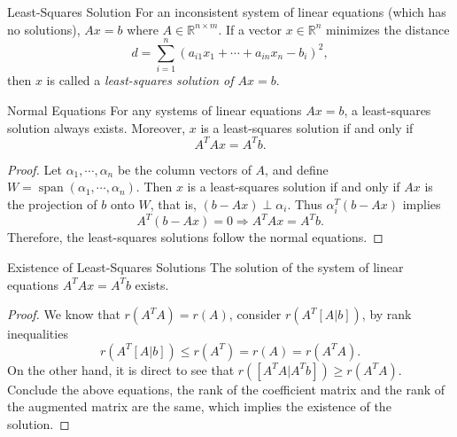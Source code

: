 \begin{definition}{Least-Squares Solution}{}
  For an inconsistent system of linear equations (which has no solutions),
  $Ax = b$ where $A \in \mathbb{R}^{n \times m}$.
  If a vector $x \in \mathbb{R}^n$ minimizes the distance
  \begin{equation}
    d = \sum\limits_{i = 1}^n (a_{i1}x_1 + \cdots + a_{in}x_n - b_i)^2,
  \end{equation}
  then $x$ is called a \emph{least-squares solution of $Ax = b$}.
\end{definition}

\begin{theorem}{Normal Equations}{}
  For any systems of linear equations $Ax = b$, a least-squares solution always
  exists.
  Moreover, $x$ is a least-squares solution if and only if
  \begin{equation}
    A^TAx = A^Tb.
  \end{equation}
\end{theorem}

\begin{proof}
  Let $\alpha_1,\cdots,\alpha_n$ be the column vectors of $A$,
  and define $W = \operatorname{span}(\alpha_1,\cdots,\alpha_n)$.
  Then $x$ is a least-squares solution if and only if $Ax$ is the projection
  of $b$ onto $W$,
  that is, $(b - Ax) \perp \alpha_i$. Thus
  $\alpha_i^T(b - Ax)$ implies
  \begin{equation}
    A^T(b - Ax) = 0 \Rightarrow A^TAx = A^Tb.
  \end{equation}
  Therefore, the least-squares solutions follow the normal equations.
\end{proof}

\begin{proposition}{Existence of Least-Squares Solutions}{}
  The solution of the system of linear equations $A^TAx = A^Tb$ exists.
\end{proposition}

\begin{proof}
  We know that $r(A^TA) = r(A)$, consider $r(A^T[A|b])$, by rank inequalities
  \begin{equation}
    r(A^T[A|b]) \leq r(A^T) = r(A) = r(A^TA).
  \end{equation}
  On the other hand, it is direct to see that $r([A^TA|A^Tb]) \geq r(A^TA)$.
  Conclude the above equations, the rank of the coefficient matrix
  and the rank of the augmented matrix are the same,
  which implies the existence of the solution.
\end{proof}




